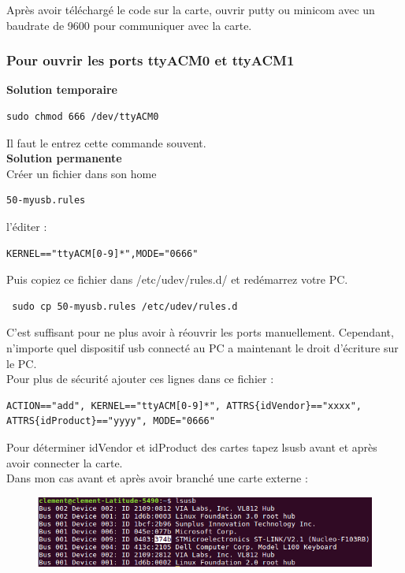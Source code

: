 \documentclass{article}
\begin{document}
Après avoir téléchargé le code sur la carte, ouvrir putty ou minicom avec un baudrate de 9600 pour communiquer avec la carte. \\

\subsubsection{Pour ouvrir les ports ttyACM0 et ttyACM1 }

\textbf{Solution temporaire} 


\begin{verbatim}
sudo chmod 666 /dev/ttyACM0
\end{verbatim}
Il faut le entrez cette commande souvent. \\
\textbf{Solution permanente}\\

Créer un fichier dans son home

\begin{verbatim}
50-myusb.rules
\end{verbatim} 

l'éditer : 

\begin{verbatim}
KERNEL=="ttyACM[0-9]*",MODE="0666"
\end{verbatim}

Puis copiez ce fichier dans /etc/udev/rules.d/ et redémarrez votre PC. \\

\begin{verbatim}
 sudo cp 50-myusb.rules /etc/udev/rules.d
\end{verbatim}
C'est suffisant pour ne plus avoir à réouvrir les ports manuellement. Cependant, n'importe quel dispositif usb connecté au PC a maintenant le droit d'écriture sur le PC. \\

Pour plus de sécurité ajouter ces lignes dans ce fichier :

\begin{verbatim}
ACTION=="add", KERNEL=="ttyACM[0-9]*", ATTRS{idVendor}=="xxxx", 
ATTRS{idProduct}=="yyyy", MODE="0666"
\end{verbatim}
 
 Pour déterminer idVendor et idProduct des cartes tapez lsusb avant et après avoir connecter la carte. \\

 Dans mon cas avant et après avoir branché une carte externe :
 
 \begin{figure}[H]
\begin{center}
\advance\leftskip-3cm
\advance\rightskip-3cm
\includegraphics[keepaspectratio=true,scale=0.5]{lsusb.png}
\label{visina8}
\end{center}\end{figure}
\end{document}
